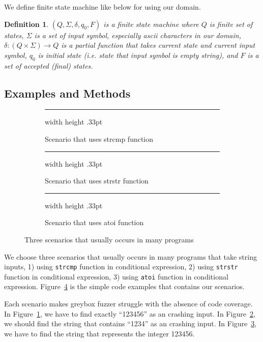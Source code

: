 \documentclass[12pt]{sigplanconf}
\newtheorem{definition}{Definition}[section]
\begin{document}
We define finite state machine like below for using our domain.

\begin{definition}
    $(Q, \Sigma, \delta, q_0, F)$ is a finite state machine where $Q$ is finite set of states, $\Sigma$ is a set of input
    symbol, especially ascii characters in our domain, $\delta : (Q \times \Sigma) \rightarrow Q$ is a partial function
    that takes current state and current input symbol, $q_0$ is initial state (i.e. state that input symbol is empty string),
    and $F$ is a set of accepted (final) states.
\end{definition}

\subsection{Examples and Methods}

\begin{figure}[h]
    \begin{subfigure}[t]{0.45\textwidth}
        \cFormat
        
        \hrule width \hsize height .33pt
        \caption{Scenario that uses strcmp function}
        \label{fig:strcmp}
    \end{subfigure}
    \begin{subfigure}[t]{0.45\textwidth}
        \cFormat
        
        \hrule width \hsize height .33pt
        \caption{Scenario that uses strstr function}
        \label{fig:strstr}
    \end{subfigure}
    \begin{subfigure}[t]{0.45\textwidth}
        \cFormat
        
        \hrule width \hsize height .33pt
        \caption{Scenario that uses atoi function}
        \label{fig:atoi}
    \end{subfigure}
    \caption{Three scenarios that usually occurs in many programs}
    \label{fig:scenarios}
\end{figure}

We choose three scenarios that usually occurs in many programs that take string inputs, 1) using \verb|strcmp| function
in conditional expression, 2) using \verb|strstr| function in conditional expression, 3) using \verb|atoi| function in
conditional expression. Figure~\ref{fig:scenarios} is the simple code examples that contains our scenarios.

Each scenario makes greybox fuzzer struggle with the absence of code coverage. In Figure~\ref{fig:strcmp}, we have to find
exactly ``123456'' as an crashing input. In Figure~\ref{fig:strstr}, we should find the string that contains ``1234'' as
an crashing input. In Figure~\ref{fig:atoi}, we have to find the string that represents the integer 123456.
\end{document}
